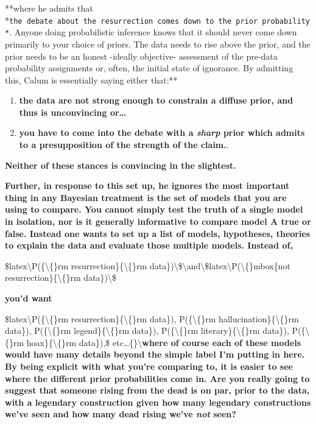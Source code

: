 \documentclass{tufte-book}
\begin{document}
**where he admits that
*\texttt{the\ debate\ about\ the\ resurrection\ comes\ down\ to\ the\ prior\ probability*}.
Anyone doing probabilistic inference knows that it should never come
down primarily to your choice of priors. The data needs to rise above
the prior, and the prior needs to be an honest -ideally objective-
assessment of the pre-data probability assignments or, often, the
initial state of ignorance. By admitting this, Calum is essentially
saying either that:**

\begin{enumerate}
\def\labelenumi{\arabic{enumi}.}
\itemsep1pt\parskip0pt
\item
  \textbf{the data are not strong enough to constrain a diffuse prior,
  and thus is unconvincing or\ldots{}}
\item
  \textbf{you have to come into the debate with a \emph{sharp} prior
  which admits to a presupposition of the strength of the claim.}.
\end{enumerate}

\textbf{Neither of these stances is convincing in the slightest.}

\textbf{Further, in response to this set up, he ignores the most
important thing in any Bayesian treatment is the set of models that you
are using to compare. You cannot simply test the truth of a single model
in isolation, nor is it generally informative to compare model A true or
false. Instead one wants to set up a list of models, hypotheses,
theories to explain the data and evaluate those multiple models. Instead
of,}

\$latex\textbackslash{}P(\{\textbackslash\{\}rm
resurrection\}\textbar{}\{\textbackslash\{\}rm
data\})\textbackslash{}\$\textbackslash{}and\textbackslash{}\$latex\textbackslash{}P(\textbackslash\{\}mbox\{not
resurrection\}\textbar{}\{\textbackslash\{\}rm data\})\textbackslash{}\$

\textbf{you'd want}

\$latex\textbackslash{}P(\{\textbackslash\{\}rm
resurrection\}\textbar{}\{\textbackslash\{\}rm data\}),
P(\{\textbackslash\{\}rm hallucination\}\textbar{}\{\textbackslash\{\}rm
data\}), P(\{\textbackslash\{\}rm
legend\}\textbar{}\{\textbackslash\{\}rm data\}),
P(\{\textbackslash\{\}rm literary\}\textbar{}\{\textbackslash\{\}rm
data\}), P(\{\textbackslash\{\}rm hoax\}\textbar{}\{\textbackslash\{\}rm
data\}),\$
etc\ldots\{\}\textbackslash{}\textbf{where of course each of these models
would have many details beyond the simple label I'm putting in here. By
being explicit with what you're comparing to, it is easier to see where
the different prior probabilities come in. Are you really going to
suggest that someone rising from the dead is on par, prior to the data,
with a legendary construction given how many legendary constructions
we've seen and how many dead rising we've \emph{not} seen?}
\end{document}

